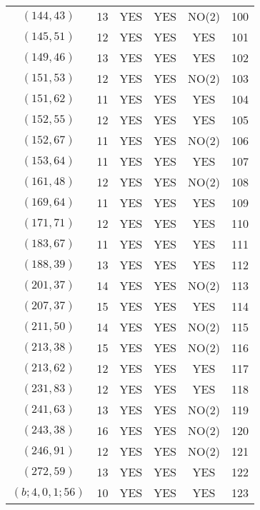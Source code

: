 \begin{longtable}{|c|c|c|c|c|c|}
$(144, 43)$ & 13 & YES & YES & NO(2) & 100\\
$(145, 51)$ & 12 & YES & YES & YES & 101\\
$(149, 46)$ & 13 & YES & YES & YES & 102\\
$(151, 53)$ & 12 & YES & YES & NO(2) & 103\\
$(151, 62)$ & 11 & YES & YES & YES & 104\\
$(152, 55)$ & 12 & YES & YES & YES & 105\\
$(152, 67)$ & 11 & YES & YES & NO(2) & 106\\
$(153, 64)$ & 11 & YES & YES & YES & 107\\
$(161, 48)$ & 12 & YES & YES & NO(2) & 108\\
$(169, 64)$ & 11 & YES & YES & YES & 109\\
$(171, 71)$ & 12 & YES & YES & YES & 110\\
$(183, 67)$ & 11 & YES & YES & YES & 111\\
$(188, 39)$ & 13 & YES & YES & YES & 112\\
$(201, 37)$ & 14 & YES & YES & NO(2) & 113\\
$(207, 37)$ & 15 & YES & YES & YES & 114\\
$(211, 50)$ & 14 & YES & YES & NO(2) & 115\\
$(213, 38)$ & 15 & YES & YES & NO(2) & 116\\
$(213, 62)$ & 12 & YES & YES & YES & 117\\
$(231, 83)$ & 12 & YES & YES & YES & 118\\
$(241, 63)$ & 13 & YES & YES & NO(2) & 119\\
$(243, 38)$ & 16 & YES & YES & NO(2) & 120\\
$(246, 91)$ & 12 & YES & YES & NO(2) & 121\\
$(272, 59)$ & 13 & YES & YES & YES & 122\\
$(b; 4, 0, 1; 56)$ & 10 & YES & YES & YES & 123
\end{longtable}
